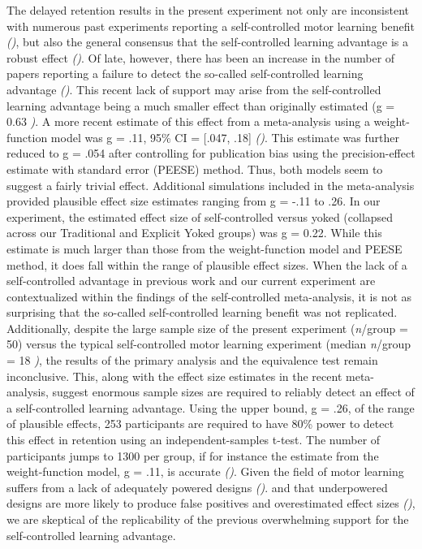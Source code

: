 \documentclass[
  english,
  jou]{apa7}
\begin{document}
The delayed retention results in the present experiment not only are inconsistent with numerous past experiments reporting a self-controlled motor learning benefit \emph{()}, but also the general consensus that the self-controlled learning advantage is a robust effect \emph{()}. Of late, however, there has been an increase in the number of papers reporting a failure to detect the so-called self-controlled learning advantage \emph{()}. This recent lack of support may arise from the self-controlled learning advantage being a much smaller effect than originally estimated (g = 0.63 \emph{)}. A more recent estimate of this effect from a meta-analysis using a weight-function model was g = .11, 95\% CI = {[}.047, .18{]} \emph{()}. This estimate was further reduced to g = .054 after controlling for publication bias using the precision-effect estimate with standard error (PEESE) method. Thus, both models seem to suggest a fairly trivial effect. Additional simulations included in the meta-analysis provided plausible effect size estimates ranging from g = -.11 to .26. In our experiment, the estimated effect size of self-controlled versus yoked (collapsed across our Traditional and Explicit Yoked groups) was g = 0.22. While this estimate is much larger than those from the weight-function model and PEESE method, it does fall within the range of plausible effect sizes. When the lack of a self-controlled advantage in previous work and our current experiment are contextualized within the findings of the self-controlled meta-analysis, it is not as surprising that the so-called self-controlled learning benefit was not replicated. Additionally, despite the large sample size of the present experiment (\emph{n}/group = 50) versus the typical self-controlled motor learning experiment (median \emph{n}/group = 18 \emph{)}, the results of the primary analysis and the equivalence test remain inconclusive. This, along with the effect size estimates in the recent meta-analysis, suggest enormous sample sizes are required to reliably detect an effect of a self-controlled learning advantage. Using the upper bound, g = .26, of the range of plausible effects, 253 participants are required to have 80\% power to detect this effect in retention using an independent-samples t-test. The number of participants jumps to 1300 per group, if for instance the estimate from the weight-function model, g = .11, is accurate \emph{()}. Given the field of motor learning suffers from a lack of adequately powered designs \emph{()}. and that underpowered designs are more likely to produce false positives and overestimated effect sizes \emph{()}, we are skeptical of the replicability of the previous overwhelming support for the self-controlled learning advantage.
\end{document}
